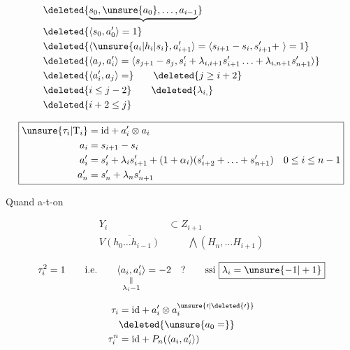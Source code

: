 
\[
\begin{aligned}
&\deleted{\underbrace{s_0,\unsure{a_0},\ldots,a_{i-1}}}\\
&\deleted{\langle s_0,a'_0\rangle=1}\\
&\deleted{\langle\unsure{a_i|h_i|s_i},a'_{i+1}\rangle=\langle s_{i+1}-s_i,s'_{i+1}+\ \rangle=1}\\
&\deleted{\langle a_j,a'_i\rangle=\langle s_{j+1}-s_j,s'_i+\lambda_{i,i+1}s'_{i+1}\ldots+\lambda_{i,n+1}s'_{n+1}\rangle}\\
&\deleted{\langle a'_i,a_j\rangle=}\qquad\deleted{j\geq i+2}\\
&\deleted{i\leq j-2}\qquad\deleted{\lambda_{i,}}\\
&\deleted{i+2\leq j}
\end{aligned}
\]

\[
\boxed{\begin{aligned}
\unsure{\tau_i|\mathrm T_i}&=\mathrm{id}+a'_i\otimes a_i\\
a_i&=s_{i+1}-s_i\\
a'_i&=s'_i+\lambda_i s'_{i+1}+(1+\alpha_i)(s'_{i+2}+\ldots+s'_{n+1})\quad 0\leq i\leq n-1\\
a'_n&=s'_n+\lambda_n s'_{n+1}
\end{aligned}}
\]


Quand a-t-on

\[
\begin{aligned}
Y_i&\subset Z_{i+1}\\
\overline{V(h_0\ldots h_{i-1})}&\qquad\bigwedge(H_n,\ldots H_{i+1})
\end{aligned}
\]

\[
\tau_i^2=1\qquad\text{i.e.}\qquad
\underset{\substack{\Vert\\\lambda_i-1}}{\langle a_i,a'_i\rangle}=-2\quad ?\qquad
\text{ssi }\boxed{\lambda_i=\unsure{-1|+1}}
\]

\[
\begin{aligned}
\tau_i&=\mathrm{id}+a'_i\otimes a^{\unsure{\prime|\deleted{\prime}}}_i\\
&\deleted{\unsure{a_0=}}\\
\tau_i^n&=\mathrm{id}+P_n(\langle a_i,a'_i\rangle)
\end{aligned}
\]

